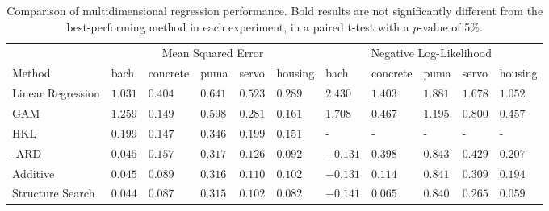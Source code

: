 \begin{table*}[ht!]
\caption{{\small
Comparison of multidimensional regression performance. Bold results are not significantly different from the best-performing method in each experiment, in a paired t-test with a $p$-value of 5\%.
}}
\label{tbl:Regression Mean Squared Error}
{\small
\begin{center}
\begin{tabularx}{\textwidth}{l | XXXXX | XXXXX}
 & \multicolumn{5}{c}{Mean Squared Error} & \multicolumn{5}{c}{Negative Log-Likelihood} \\
 Method & bach  & concrete  & puma  &  servo & housing
& bach  & concrete  & puma  &  servo & housing
\\ \hline
Linear Regression 
& $1.031$ & $0.404$ & $0.641$ & $0.523$ & $0.289$ 
& $2.430$ & $1.403$ & $1.881$ & $1.678$ & $1.052$ \\
GAM 
& $1.259$ & $0.149$ & $0.598$ & $0.281$ & $0.161$ 
& $1.708$ & $0.467$ & $1.195$ & $0.800$ & $0.457$ \\
HKL 
& $\mathbf{0.199}$ & $0.147$ & $0.346$ & $0.199$ & $0.151$ 
& - & - & - & - & -\\
\gp{} \kSE{}-ARD 
& $\mathbf{0.045}$ & $0.157$ & $0.317$ & $0.126$ & $\mathbf{0.092}$ 
& $\mathbf{-0.131}$ & $0.398$ & $0.843$ & $0.429$ & $0.207$ \\
\gp{} Additive 
& $\mathbf{0.045}$ & $\mathbf{0.089}$ & $\mathbf{0.316}$ & $\mathbf{0.110}$ & $0.102$ 
& $\mathbf{-0.131}$ & $\mathbf{0.114}$ & $\mathbf{0.841}$ & $\mathbf{0.309}$ & $0.194$ \\
\hline
Structure Search 
& $\mathbf{0.044}$ & $\mathbf{0.087}$ & $\mathbf{0.315}$ & $\mathbf{0.102}$ & $\mathbf{0.082}$ 
& $\mathbf{-0.141}$ & $\mathbf{0.065}$ & $\mathbf{0.840}$ & $\mathbf{0.265}$ & $\mathbf{0.059}$
\end{tabularx}
\end{center}
}
\end{table*}
